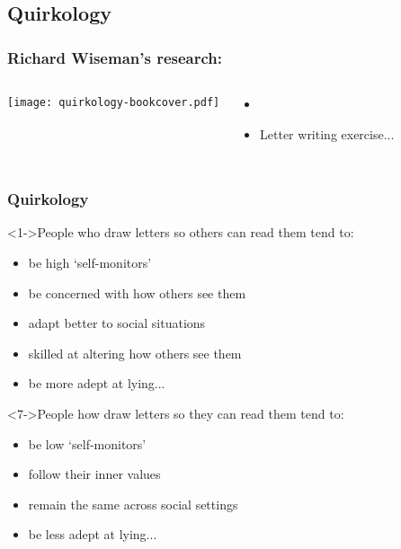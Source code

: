 \subsection{Quirkology}

\begin{frame}
  \frametitle{Richard Wiseman's research:}
  
  \begin{columns}
    \texttt{[image: quirkology-bookcover.pdf]}\\
    \begin{itemize}
    \item<1-> 
    \item<2-> 
      Letter writing exercise...
    \end{itemize}
  \end{columns}
  
\end{frame}

\begin{frame}
  \frametitle{Quirkology}

  \begin{block}<1->{People who draw letters so others can read them tend to:}
    \begin{itemize}
    \item<2-> 
      be high `self-monitors'
    \item<3-> 
      be concerned with how others see them
    \item<4-> 
      adapt better to social situations
    \item<5-> 
      skilled at altering how others see them
    \item<6-> 
      be more adept at lying...
    \end{itemize}    
  \end{block}

  \begin{block}<7->{People how draw letters so they can read them tend to:}
    \begin{itemize}
    \item<8->
      be low `self-monitors'
    \item<9->
      follow their inner values
    \item<10->
      remain the same across social settings
    \item<11->
      be less adept at lying...
    \end{itemize}
  \end{block}

\end{frame}


